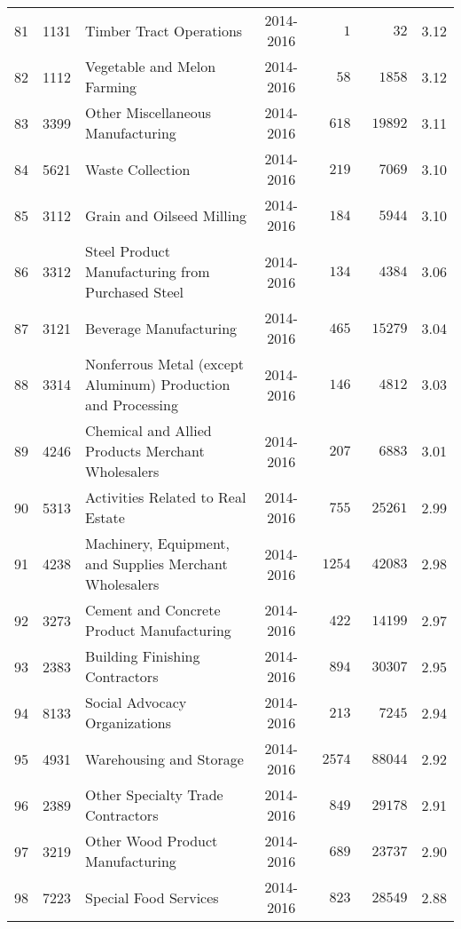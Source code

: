 \documentclass[9pt, oneside]{article}   	%
\begin{document}
\begin{longtable}{lcp{3in}cccc}
81  & 1131 & Timber Tract Operations & 2014-2016 & $\phantom{0000}1$ & $\phantom{0000}32$ &  3.12 \\
82  & 1112 & Vegetable and Melon Farming & 2014-2016 & $\phantom{000}58$ & $\phantom{00}1858$ &  3.12 \\
83  & 3399 & Other Miscellaneous Manufacturing & 2014-2016 & $\phantom{00}618$ & $\phantom{0}19892$ &  3.11 \\
84  & 5621 & Waste Collection & 2014-2016 & $\phantom{00}219$ & $\phantom{00}7069$ &  3.10 \\
85  & 3112 & Grain and Oilseed Milling & 2014-2016 & $\phantom{00}184$ & $\phantom{00}5944$ &  3.10 \\
86  & 3312 & Steel Product Manufacturing from Purchased Steel & 2014-2016 & $\phantom{00}134$ & $\phantom{00}4384$ &  3.06 \\
87  & 3121 & Beverage Manufacturing & 2014-2016 & $\phantom{00}465$ & $\phantom{0}15279$ &  3.04 \\
88  & 3314 & Nonferrous Metal (except Aluminum) Production and Processing & 2014-2016 & $\phantom{00}146$ & $\phantom{00}4812$ &  3.03 \\
89  & 4246 & Chemical and Allied Products Merchant Wholesalers & 2014-2016 & $\phantom{00}207$ & $\phantom{00}6883$ &  3.01 \\
90  & 5313 & Activities Related to Real Estate & 2014-2016 & $\phantom{00}755$ & $\phantom{0}25261$ &  2.99 \\
91  & 4238 & Machinery, Equipment, and Supplies Merchant Wholesalers & 2014-2016 & $\phantom{0}1254$ & $\phantom{0}42083$ &  2.98 \\
92  & 3273 & Cement and Concrete Product Manufacturing & 2014-2016 & $\phantom{00}422$ & $\phantom{0}14199$ &  2.97 \\
93  & 2383 & Building Finishing Contractors & 2014-2016 & $\phantom{00}894$ & $\phantom{0}30307$ &  2.95 \\
94  & 8133 & Social Advocacy Organizations & 2014-2016 & $\phantom{00}213$ & $\phantom{00}7245$ &  2.94 \\
95  & 4931 & Warehousing and Storage & 2014-2016 & $\phantom{0}2574$ & $\phantom{0}88044$ &  2.92 \\
96  & 2389 & Other Specialty Trade Contractors & 2014-2016 & $\phantom{00}849$ & $\phantom{0}29178$ &  2.91 \\
97  & 3219 & Other Wood Product Manufacturing & 2014-2016 & $\phantom{00}689$ & $\phantom{0}23737$ &  2.90 \\
98  & 7223 & Special Food Services & 2014-2016 & $\phantom{00}823$ & $\phantom{0}28549$ &  2.88 \\

\end{longtable}
\end{document}
